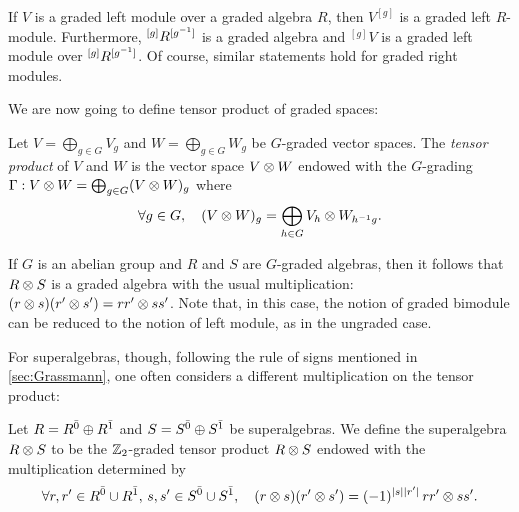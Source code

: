 If $V$ is a graded left module over a graded algebra $R$, then $V^{[g]}$ is a graded left $R$-module. 
Furthermore, ${}^{[g]} R ^{[g^{-1}]}$ is a graded algebra and ${}^{[g]}V$ is a graded left module over ${}^{[g]} R ^{[g^{-1}]}$. 
Of course, similar statements hold for graded right modules. 





We are now going to define tensor product of graded spaces:

\begin{defi}\label{defi:tensorProduct}
    Let $V=\bigoplus_{g\in G} V_g$ and $W=\bigoplus_{g\in G} W_g$ be $G$-graded vector spaces. 
    The \emph{tensor product} of $V$ and $W$ is the vector space $V \otimes W$ endowed with the $G$-grading $\Gamma : V \otimes W = \bigoplus_{g\in G} (V \otimes W)_g$ where
    \[
        \forall g\in G, \quad (V \otimes W)_g = \bigoplus_{h\in G} V_{h} \otimes W_{h^{-1} g}.
    \]
\end{defi}

\label{defi:tensor-algebras}

If $G$ is an abelian group and $R$ and $S$ are $G$-graded algebras, then it follows that $R \otimes S$ is a graded algebra with the usual multiplication: $(r \otimes s) (r' \otimes s') = rr' \otimes ss'$. 
Note that, in this case, the notion of graded bimodule can be reduced to the notion of left module, as in the ungraded case. 


For superalgebras, though, following the rule of signs mentioned in \cref{sec:Grassmann}, one often considers a different multiplication on the tensor product:

\begin{defi}\label{defi:tensorSuperalgebras}
    Let $R = R^{\bar0} \oplus R^{\bar1}$ and $S = S^{\bar0} \oplus S^{\bar1}$ be superalgebras. 
    We define the superalgebra $R \otimes S$ to be the $\mathbb{Z}_2$-graded tensor product $R \otimes S$ endowed with the multiplication determined by
    \[
        \forall r, r' \in R^{\bar0} \cup R^{\bar1}, \, s,s' \in S^{\bar0} \cup S^{\bar1}, \quad 
        (r \otimes s) (r' \otimes s')
        = (-1)^{|s||r'|} \, rr' \otimes ss'.
    \]
\end{defi}

